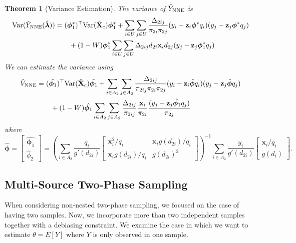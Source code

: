 \documentclass[12pt]{article}
\newtheorem{theorem}{Theorem}
\newcommand{\Var}{{\text{Var}}}
\renewcommand{\bf}[1]{\mathbf{#1}}
\begin{document}
\begin{theorem}[Variance Estimation]\label{thm:nnve}
  The variance of $\hat Y_{\rm NNE}$ is 
  \begin{align*}
    \Var(\hat Y_{\rm NNE}(\hat{\bm \lambda}))
    &= (\bm \phi_1^*)^\top \Var(\hat{\bf X}_c) \bm \phi_1^* + 
    \sum_{i \in U} \sum_{j \in U} \frac{\Delta_{2ij}}{\pi_{2i}\pi_{2j}} 
      (y_i - \bf z_i \bm \phi^* q_i)(y_j - \bf z_j \bm \phi^* q_j)\\
    &\qquad + (1 - W)\bm \phi_1^* \sum_{i \in U} \sum_{j \in U} \Delta_{2ij}
    d_{2i} \bf x_i d_{2j}(y_j - \bf z_j \bm \phi^*_1 q_j)\\
  \end{align*}
  We can estimate the variance using
  \begin{align*}
    \hat V_{\rm NNE} 
    &= (\hat{\bm \phi_1})^\top \Var(\hat{\bf X}_c) \hat{\bm \phi_1} + 
    \sum_{i \in A_2} \sum_{j \in A_2} \frac{\Delta_{2ij}}{\pi_{2ij}\pi_{2i}\pi_{2j}} 
    (y_i - \bf z_i \hat{\bm \phi} q_i)(y_j - \bf z_j \hat{\bm \phi} q_j) \\
    &\qquad + (1 - W)\hat{\bm \phi_1} \sum_{i \in A_2} \sum_{j \in A_2} \frac{\Delta_{2ij}}{\pi_{2ij}}
    \frac{\bf x_i}{\pi_{2i}} \frac{(y_j - \bf z_j \hat{\bm \phi_1} q_j)}{\pi_{2j}}
  \end{align*}
  where 
  $$\hat{\bm \phi} =
  \begin{bmatrix}
    \hat{\bm \phi_1} \\ \hat \phi_2
  \end{bmatrix} = 
  \left(\sum_{i \in A_2} \frac{q_i}{g'(d_{2i})} 
  \begin{bmatrix}
    \bf x_i^2 / q_i & \bf x_i g(d_{2i}) / q_i \\
    \bf x_i g(d_{2i}) / q_i & g(d_{2i})^2
  \end{bmatrix}
  \right)^{-1}
  \sum_{i \in A_2} \frac{y_i}{g'(d_{2i})} 
  \begin{bmatrix} \bf x_i / q_i \\ g(d_i) \end{bmatrix}.
  $$
\end{theorem}

\subsection{Multi-Source Two-Phase Sampling}

When considering non-nested two-phase sampling, we focused on the case of having
two samples. Now, we incorporate more than two independent samples
together with a debiasing constraint. We examine the case in which we
want to estimate $\theta = E[Y]$ where $Y$ is only observed in one sample.
\end{document}
